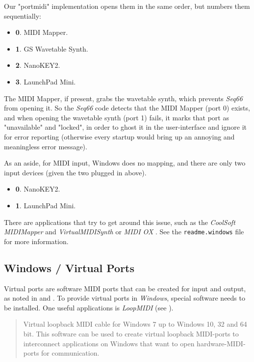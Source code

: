    Our "portmidi" implementation opens them in the same order, but
   numbers them sequentially:

   \begin{itemize}
      \item \textbf{0}. MIDI Mapper.
      \item \textbf{1}. GS Wavetable Synth.
      \item \textbf{2}. NanoKEY2.
      \item \textbf{3}. LaunchPad Mini.
   \end{itemize}

   The MIDI Mapper, if present, grabs the wavetable synth, which prevents
   \textsl{Seq66} from opening it.
   So the \textsl{Seq66}
   code detects that the MIDI Mapper (port 0) exists, and when opening
   the wavetable synth (port 1) fails, it marks that port as
   "unavailable" and "locked", in order to ghost it in the user-interface
   and ignore it for error reporting (otherwise every startup would bring
   up an annoying and meaningless error message).

   As an aside, for MIDI input, Windows does no mapping, and there are
   only two input devices (given the two plugged in above).

   \begin{itemize}
      \item \textbf{0}. NanoKEY2.
      \item \textbf{1}. LaunchPad Mini.
   \end{itemize}

   There are applications that try to get around this issue, such as
   the \textsl{CoolSoft MIDIMapper} and \textsl{VirtualMIDISynth}
   \cite{midimapper} or \textsl{MIDI OX} \cite{midiox}.
   See the \texttt{readme.windows} file for more information.

\subsection{Windows / Virtual Ports}
\label{subsec:windows_virtual_ports}

   Virtual ports are software MIDI ports that can be created for
   input and output, as noted in
    and
   .
   To provide virtual ports in \textsl{Windows},
   special software needs to be installed.
   One useful applications is \textsl{LoopMIDI} (see \cite{loopmidi}).

   \begin{quote}
      Virtual loopback MIDI cable for Windows 7 up to Windows 10, 32 and 64
      bit.  This software can be used to create virtual loopback MIDI-ports to
      interconnect applications on Windows that want to open
      hardware-MIDI-ports for communication.
   \end{quote}

